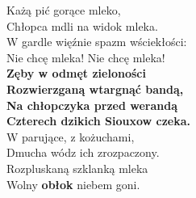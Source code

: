 \documentclass{article}
\begin{document}
	\begin{flushleft}
		Każą pić gorące mleko, \\
		Chłopca mdli na widok mleka. \\	
		W gardle więźnie spazm wściekłości: \\
		Nie chcę mleka! Nie chcę mleka!\\
		\textbf{Zęby w odmęt zieloności \\
		Rozwierzganą wtargnąć bandą, \\
		Na chłopczyka przed werandą \\
		Czterech dzikich Siouxow czeka.} \\
		W parujące, z kożuchami, \\
		Dmucha wódz ich zrozpaczony. \\
		Rozpluskaną szklanką mleka \\
		Wolny \textbf{obłok} niebem goni. \\	
	\end{flushleft}
\end{document}
